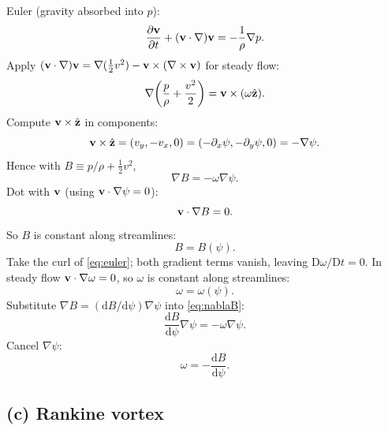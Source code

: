 \documentclass[11pt]{article}
\newcommand{\D}{\mathrm{D}}
\newcommand{\de}{\mathrm{d}}
\newcommand{\pd}[2]{\frac{\partial #1}{\partial #2}}
\begin{document}
Euler (gravity absorbed into $p$):
\begin{equation}
\pd{\vb v}{t} + (\vb v\cdot\nabla)\vb v = -\frac{1}{\rho}\nabla p.
\label{eq:euler}
\end{equation}
Apply $(\vb v\cdot\nabla)\vb v = \nabla(\tfrac12 v^2) - \vb v\times(\nabla\times\vb v)$ for steady flow:
\[ \nabla\!\left(\frac{p}{\rho}+\frac{v^2}{2}\right) = \vb v\times(\omega\hat{\vb z}). \]
Compute $\vb v\times\hat{\vb z}$ in components:
\[ \vb v\times\hat{\vb z} = (v_y,-v_x,0) = (-\partial_x\psi,-\partial_y\psi,0) = -\nabla\psi. \]
Hence with $B\equiv p/\rho + \tfrac12 v^2$,
\begin{equation}
\nabla B = -\omega\nabla\psi.
\label{eq:nablaB}
\end{equation}
Dot with $\vb v$ (using $\vb v\cdot\nabla\psi = 0$):
\[ \vb v\cdot\nabla B = 0. \]
So $B$ is constant along streamlines:
\begin{equation}
\boxed{\;B = B(\psi).\;}
\end{equation}
Take the curl of \eqref{eq:euler}; both gradient terms vanish, leaving $\D\omega/\D t=0$. In steady flow $\vb v\cdot\nabla\omega = 0$, so $\omega$ is constant along streamlines:
\begin{equation}
\boxed{\;\omega = \omega(\psi).\;}
\end{equation}
Substitute $\nabla B = (\de B/\de\psi)\nabla\psi$ into \eqref{eq:nablaB}:
\[ \frac{\de B}{\de\psi}\nabla\psi = -\omega\nabla\psi. \]
Cancel $\nabla\psi$:
\begin{equation}
\boxed{\;\omega = -\frac{\de B}{\de\psi}.\;}
\end{equation}

\subsection*{(c) Rankine vortex}
\end{document}
